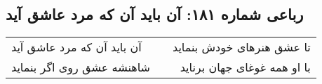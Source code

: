 \begin{center}
\section*{رباعی شماره ۱۸۱: آن باید آن که مرد عاشق آید}
\label{sec:sh181}
\begin{longtable}{l p{0.5cm} r}
آن باید آن که مرد عاشق آید
&&
تا عشق هنرهای خودش بنماید
\\
شاهنشه عشق روی اگر بنماید
&&
با او همه غوغای جهان برناید
\\
\end{longtable}
\end{center}
